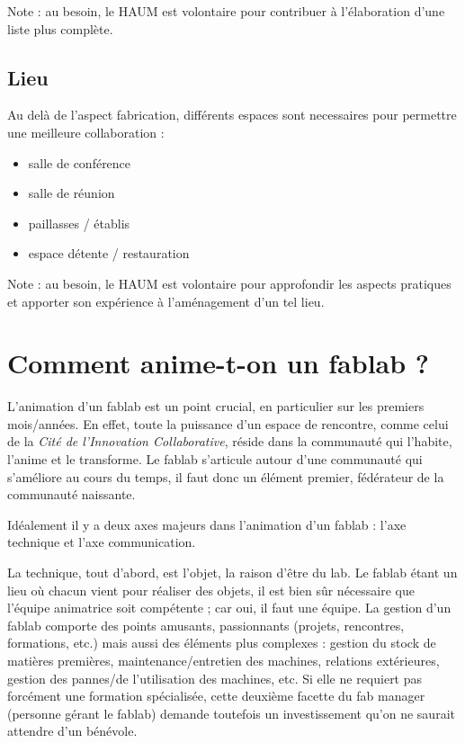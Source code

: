 \documentclass[a4paper,10pt]{scrartcl}
\begin{document}
Note : au besoin, le HAUM est volontaire pour contribuer à l'élaboration d'une liste plus complète.

\subsection*{Lieu}

Au delà de l'aspect fabrication, différents espaces sont necessaires pour permettre une meilleure collaboration :
\begin{itemize}
 \item salle de conférence
 \item salle de réunion
 \item paillasses / établis
 \item espace détente / restauration
\end{itemize}

Note : au besoin, le HAUM est volontaire pour approfondir les aspects pratiques et apporter son expérience à l'aménagement d'un tel lieu.

\section{Comment anime-t-on un fablab ?}
L'animation d'un fablab est un point crucial, en particulier sur les premiers mois/années. En effet, toute la puissance d'un espace de rencontre, comme celui de la \emph{Cité de l'Innovation Collaborative}, réside dans la communauté qui l'habite, l'anime et le transforme.
Le fablab s'articule autour d'une communauté qui s'améliore au cours du temps, il faut donc un élément premier, fédérateur de la communauté naissante.

Idéalement il y a deux axes majeurs dans l'animation d'un fablab : l'axe technique et l'axe communication.

La technique, tout d'abord, est l'objet, la raison d'être du lab. Le fablab étant un lieu où chacun vient pour réaliser des objets, il est bien sûr nécessaire que l'équipe animatrice soit compétente ; car oui, il faut une équipe.
La gestion d'un fablab comporte des points amusants, passionnants (projets, rencontres, formations, etc.) mais aussi des éléments plus complexes : gestion du stock de matières premières, maintenance/entretien des machines, relations extérieures, gestion des pannes/de l'utilisation des machines, etc.
Si elle ne requiert pas forcément une formation spécialisée, cette deuxième facette du fab manager (personne gérant le fablab) demande toutefois un investissement qu'on ne saurait attendre d'un bénévole.
\end{document}
